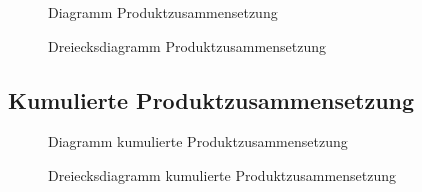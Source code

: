 \begin{figure}[H]
    \centering
    
        \caption{Diagramm Produktzusammensetzung}
    \label{fig:Trennstufe}
\end{figure}

\begin{figure}[H]
    \centering
    
        \caption{Dreiecksdiagramm Produktzusammensetzung}
    \label{fig:Trennstufe}
\end{figure}


\subsection{Kumulierte Produktzusammensetzung}

\begin{figure}[H]
    \centering
    
        \caption{Diagramm kumulierte Produktzusammensetzung}
    \label{fig:Trennstufe}
\end{figure}

\begin{figure}[H]
    \centering
    
        \caption{Dreiecksdiagramm kumulierte Produktzusammensetzung}
    \label{fig:Trennstufe}
\end{figure}
